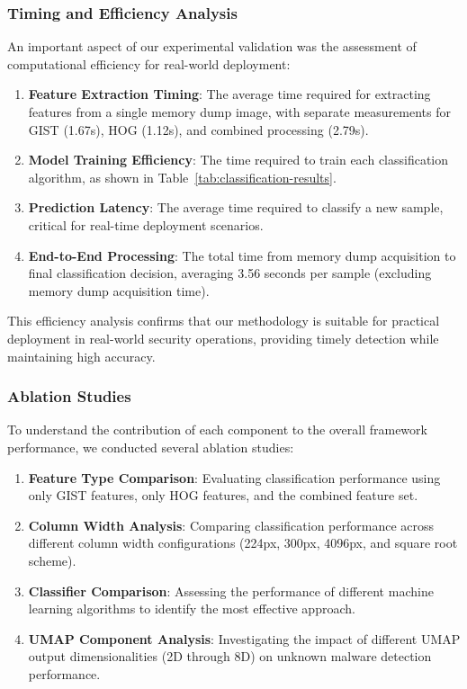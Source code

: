 \subsubsection{Timing and Efficiency Analysis}

An important aspect of our experimental validation was the assessment of computational efficiency for real-world deployment:

\begin{enumerate}
    \item \textbf{Feature Extraction Timing}: The average time required for extracting features from a single memory dump image, with separate measurements for GIST (1.67s), HOG (1.12s), and combined processing (2.79s).
    
    \item \textbf{Model Training Efficiency}: The time required to train each classification algorithm, as shown in Table~\ref{tab:classification-results}.
    
    \item \textbf{Prediction Latency}: The average time required to classify a new sample, critical for real-time deployment scenarios.
    
    \item \textbf{End-to-End Processing}: The total time from memory dump acquisition to final classification decision, averaging 3.56 seconds per sample (excluding memory dump acquisition time).
\end{enumerate}

This efficiency analysis confirms that our methodology is suitable for practical deployment in real-world security operations, providing timely detection while maintaining high accuracy.

\subsubsection{Ablation Studies}

To understand the contribution of each component to the overall framework performance, we conducted several ablation studies:

\begin{enumerate}
    \item \textbf{Feature Type Comparison}: Evaluating classification performance using only GIST features, only HOG features, and the combined feature set.
    
    \item \textbf{Column Width Analysis}: Comparing classification performance across different column width configurations (224px, 300px, 4096px, and square root scheme).
    
    \item \textbf{Classifier Comparison}: Assessing the performance of different machine learning algorithms to identify the most effective approach.
    
    \item \textbf{UMAP Component Analysis}: Investigating the impact of different UMAP output dimensionalities (2D through 8D) on unknown malware detection performance.
\end{enumerate}


